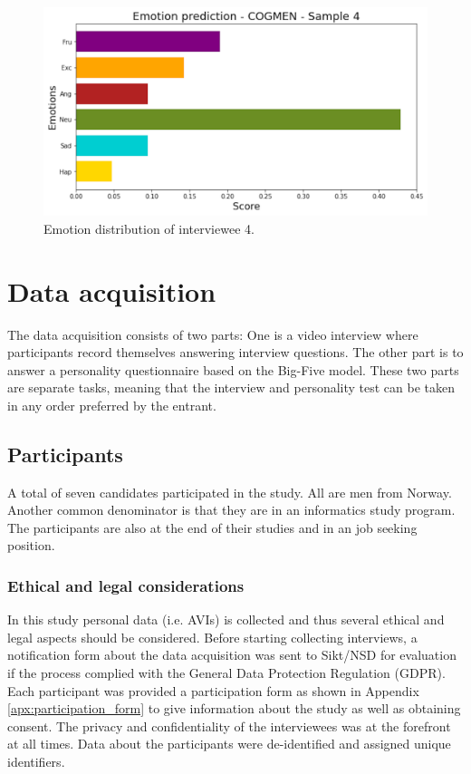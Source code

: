 %
\begin{equation*}
    [Conscientiousness, Agreeableness, Openness]
\end{equation*}
%
\newpage
%
\begin{figure}[h!]
  \centering
  \includegraphics[width=\textwidth]{figures/emotion_distribution_sample4.png}
  \caption{Emotion distribution of interviewee 4.}
  \label{fig:emotion_personality4}
\end{figure}
%

\section{Data acquisition}
\label{sec:data_aqusition}
The data acquisition consists of two parts: One is a video interview where participants record themselves answering interview questions. The other part is to answer a personality questionnaire based on the Big-Five model. These two parts are separate tasks, meaning that the interview and personality test can be taken in any order preferred by the entrant. 

\subsection{Participants}
A total of seven candidates participated in the study. All are men from Norway. Another common denominator is that they are in an informatics study program. The participants are also at the end of their studies and in an job seeking position. 

\subsubsection{Ethical and legal considerations}
In this study personal data (i.e. AVIs) is collected and thus several ethical and legal aspects should be considered. Before starting collecting interviews, a notification form about the data acquisition was sent to Sikt/NSD for evaluation if the process complied with the General Data Protection Regulation (GDPR). Each participant was provided a participation form as shown in Appendix \ref{apx:participation_form} to give information about the study as well as obtaining consent. The privacy and confidentiality of the interviewees was at the forefront at all times. Data about the participants were de-identified and assigned unique identifiers.  


